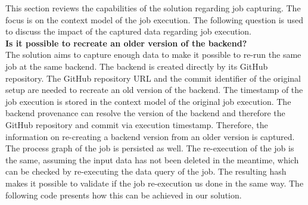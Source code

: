 \documentclass[draft,final]{vutinfth} %
\begin{document}
This section reviews the capabilities of the solution regarding job capturing. The focus is on the context model of the job execution. The following question is used to discuss the impact of the captured data regarding job execution. \\

\textbf{Is it possible to recreate an older version of the backend?} \\
The solution aims to capture enough data to make it possible to re-run the same job at the same backend. The backend is created directly by its GitHub repository. The GitHub repository URL and the commit identifier of the original setup are needed to recreate an old version of the backend. The timestamp of the job execution is stored in the context model of the original job execution. The backend provenance can resolve the version of the backend and therefore the GitHub repository and commit via execution timestamp. Therefore, the information on re-creating a backend version from an older version is captured. The process graph of the job is persisted as well. The re-execution of the job is the same, assuming the input data has not been deleted in the meantime, which can be checked by re-executing the data query of the job. The resulting hash makes it possible to validate if the job re-execution us done in the same way. The following code presents how this can be achieved in our solution.
\newpage
\end{document}

